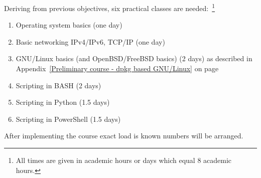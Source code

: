 Deriving from previous objectives, six practical classes are needed:~\footnote{All times are given in academic hours or days which equal 8 academic hours.}

\begin{enumerate}[label=LAB \arabic*.,leftmargin=*]
\item Operating system basics (one day)
\item Basic networking IPv4/IPv6, TCP/IP (one day)
\item GNU/Linux basics (and OpenBSD/FreeBSD basics) (2 days) as described in Appendix~\ref{Preliminary course - dpkg based GNU/Linux} on page~\pageref{Preliminary course - dpkg based GNU/Linux}
\item Scripting in BASH (2 days)
\item Scripting in Python (1.5 days)
\item Scripting in PowerShell (1.5 days)
\end{enumerate}
After implementing the course exact load is known numbers will be arranged.

